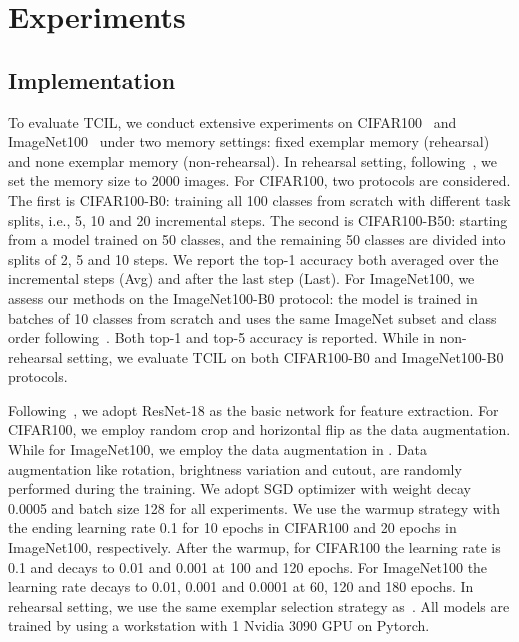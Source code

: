 \documentclass[letterpaper]{article} %
\begin{document}
\section{Experiments}\label{experiment}

\subsection{Implementation}
To evaluate TCIL, we conduct extensive experiments on CIFAR100~\cite{e6} and ImageNet100~\cite{e7} under two memory settings: fixed exemplar memory (rehearsal) and none exemplar memory (non-rehearsal). In rehearsal setting, following~\cite{t0, t70, t54, t19}, we set the memory size to 2000 images. For CIFAR100, two protocols are considered. The first is CIFAR100-B0: training all 100 classes from scratch with different task splits, i.e., 5, 10 and 20 incremental steps. The second is CIFAR100-B50: starting from a model trained on 50 classes, and the remaining 50 classes are divided into splits of 2, 5 and 10 steps. We report the top-1 accuracy both averaged over the incremental steps (Avg) and after the last step (Last). For ImageNet100, we assess our methods on the ImageNet100-B0 protocol: the model is trained in batches of 10 classes from scratch and uses the same ImageNet subset and class order following~\cite{t19, t32, t54, t70}. Both top-1 and top-5 accuracy is reported. While in non-rehearsal setting, we evaluate TCIL on both CIFAR100-B0 and ImageNet100-B0 protocols. 

Following~\cite{t47, t70}, we adopt ResNet-18 as the basic network for feature extraction. For CIFAR100, we employ random crop and horizontal flip as the data augmentation. While for ImageNet100, we employ the data augmentation in \cite{e13}. Data augmentation like rotation, brightness variation and cutout, are randomly performed during the training. We adopt SGD optimizer with weight decay 0.0005 and batch size 128 for all experiments. We use the warmup strategy with the ending learning rate 0.1 for 10 epochs in CIFAR100 and 20 epochs in ImageNet100, respectively. After the warmup, for CIFAR100 the learning rate is 0.1 and decays to 0.01 and 0.001 at 100 and 120 epochs. For ImageNet100 the learning rate decays to 0.01, 0.001 and 0.0001 at 60, 120 and 180 epochs. In rehearsal setting, we use the same exemplar selection strategy as~\cite{t54, t32}. All models are trained by using a workstation with 1 Nvidia 3090 GPU on Pytorch.
\end{document}
